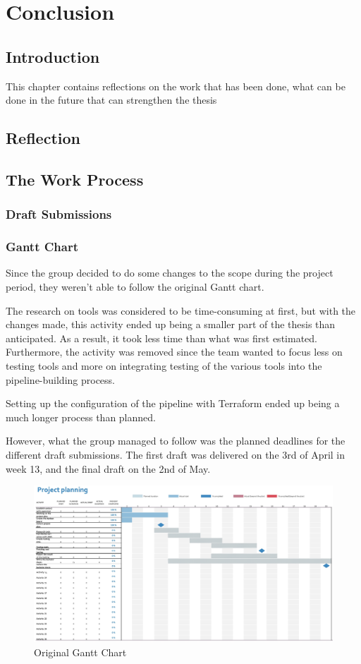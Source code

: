 \chapter{Conclusion}
\section{Introduction}
This chapter contains reflections on the work that has been done, what can be done in the future that can strengthen the thesis

\section{Reflection}


\section{The Work Process}

\subsection{Draft Submissions}


\subsection{Gantt Chart}
Since the group decided to do some changes to the scope during the project period, they weren't able to follow the original Gantt chart. 

The research on tools was considered to be time-consuming at first, but with the changes made, this activity ended up being a smaller part of the thesis than anticipated. As a result, it took less time than what was first estimated. Furthermore, the activity was removed since the team wanted to focus less on testing tools and more on integrating testing of the various tools into the pipeline-building process. 

Setting up the configuration of the pipeline with Terraform ended up being a much longer process than planned. 

However, what the group managed to follow was the planned deadlines for the different draft submissions. The first draft was delivered on the 3rd of April in week 13, and the final draft on the 2nd of May.

\vspace{2mm}
\begin{figure}[H]
    \centering
    \includegraphics[width=0.8\columnwidth]{Images/gantt2.jpg}
    \caption{Original Gantt Chart}
    \label{fig: Original Gantt Chart}
\end{figure}

